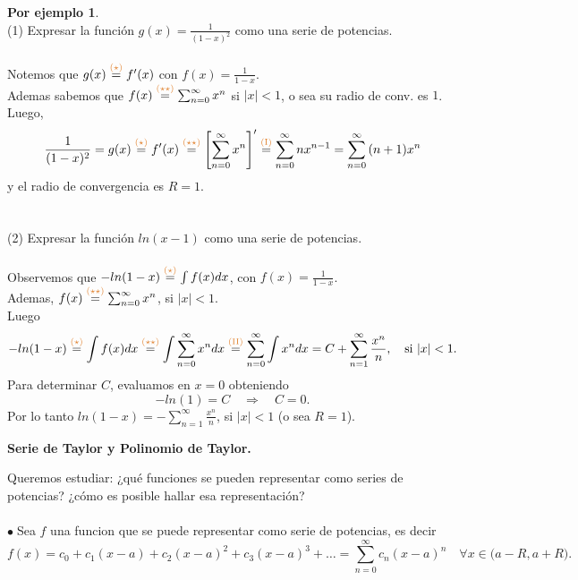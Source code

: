 \documentclass{article}
\theoremstyle{definition}
\theoremstyle{definition}
\newtheorem*{ej}{Por ejemplo}
\theoremstyle{remark}
\newcommand\bl{$\bullet\;$}
\begin{document}
\begin{ej} \; \\
 (1) \quad  Expresar la función $g(x)=\frac{1}{(1-x)^2}$ como una serie de potencias. \\ \\
  Notemos que $g(x)\overset{\textcolor{rojop2}{(\star)}}{=}f'(x)$ con $f(x)=\frac{1}{1-x}.$ \\ 
  Ademas sabemos que $f(x)\overset{\textcolor{rojop2}{(\star\star)}}{=}\sum_{n=0}^{\infty}{x^n}$ si $|x|<1$, o sea su radio de conv. es $1$. \\ 
  Luego, \[\frac{1}{(1-x)^2}=g(x)\overset{\textcolor{rojop2}{(\star)}}{=}f'(x)\overset{\textcolor{rojop2}{(\star\star)}}{=}\left[\sum_{n=0}^{\infty}{x^n}\right]'\overset{\textcolor{rojop2}{\text{(I)}}}{=}\sum_{n=0}^{\infty}{nx^{n-1}}=\sum_{n=0}^{\infty}{(n+1)x^n}\] y el radio de convergencia es $R=1$. \\ \\ \\
  (2) Expresar la función $ln(x-1)$ como una serie de potencias. \\ \\ 
  Observemos que  $-ln(1-x)\overset{\textcolor{rojop2}{(\star)}}{=}\int{f(x)dx}$, con $f(x)=\frac{1}{1-x}$. \\
  Ademas, $f(x)\overset{\textcolor{rojop2}{(\star\star)}}{=}\sum_{n=0}^{\infty}{x^n}$, si $|x|<1$. \\
  Luego \[
-ln(1-x)\overset{\textcolor{rojop2}{(\star)}}{=}\int{f(x)dx}\overset{\textcolor{rojop2}{(\star\star)}}{=}\int{\sum_{n=0}^{\infty}{x^n}dx}\overset{\textcolor{rojop2}{\text{(II)}}}{=}\sum_{n=0}^{\infty}{\int{x^ndx}}=C+\sum_{n=1}^{\infty}{\frac{x^n}{n}}, \quad \text{si } |x|<1.
  \]
  Para determinar $C$, evaluamos en $x=0$ obteniendo \[
-ln(1)=C \quad \Rightarrow \quad C=0.
  \]
  Por lo tanto \quad $ln(1-x)=-\sum_{n=1}^{\infty}{\frac{x^n}{n}}$, si $|x|<1$ \quad \big(o sea $R=1$\big).
\end{ej} 
\pagebreak
\begin{center}
  \textbf{Serie de Taylor y Polinomio de Taylor.}
\end{center}
Queremos estudiar: ¿qué funciones se pueden representar como series de potencias? ¿cómo es posible hallar esa representación? \\\\

\bl Sea $f$ una funcion que se puede representar como serie de potencias, es decir \[ 
  f(x)=c_0+c_1(x-a)+c_2(x-a)^2+c_3(x-a)^3+\dots = \sum_{n=0}^{\infty}{c_n(x-a)^n} \quad \forall x \in \big(a-R,a+R\big).
\]
\end{document}
